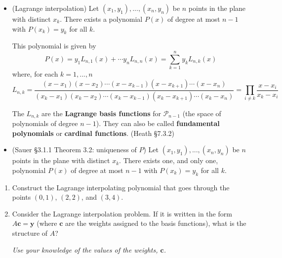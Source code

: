 \documentclass[12pt,letterpaper,noanswers]{exam}
\newcommand{\vc}[1]{\boldsymbol{#1}}
\begin{document}
\begin{tcolorbox}
\begin{itemize}
\itemsep0pt
\item (Lagrange interpolation)
Let $(x_1,y_1),...,(x_n,y_n)$ be $n$ points in the plane with distinct $x_k$.  There exists a polynomial $P(x)$ of degree at most $n-1$
with $P(x_k) = y_k$ for all $k$.

This polynomial is given by 
\[
P(x) = y_1L_{n,1}(x) + \cdots y_n L_{n,n}(x) = \sum_{k=1}^n y_k L_{n,k}(x)
\]
where, for each $k=1,...,n$
\[
L_{n,k} = \frac{(x-x_1)(x-x_2)\cdots(x-x_{k-1})(x-x_{k+1})\cdots(x-x_n)}
{(x_k-x_1)(x_k-x_2)\cdots(x_k-x_{k-1})(x_k-x_{k+1})\cdots(x_k-x_n)}
=\prod_{i\ne k} \frac{x-x_i}{x_k-x_i}
\]

The $L_{n,k}$ are the \textbf{Lagrange basis functions} for $\mathcal{P}_{n-1}$ (the space of polynomials of degree $n-1$).  They can also be called \textbf{fundamental polynomials} or \textbf{cardinal functions}.  (Heath \S 7.3.2)

\item (Sauer \S 3.1.1 Theorem 3.2: uniqueness of $P$) 
Let $(x_1,y_1),...,(x_n,y_n)$ be $n$ points in the plane with distinct $x_k$.  There exists one, and only one, polynomial $P(x)$ of degree at most $n-1$
with $P(x_k) = y_k$ for all $k$.


\end{itemize}

 
\end{tcolorbox}

\begin{enumerate}[resume=classQ]

\item Construct the Lagrange interpolating polynomial that goes through the points $(0,1)$, $(2,2)$, and $(3,4)$.  %

\vspace{1in}

\item Consider the Lagrange interpolation problem.  If it is written in the form $A\vc{c} = \vc{y}$ (where $\mathbf{c}$ are the weights assigned to the basis functions), what is the structure of $A$?

\emph{Use your knowledge of the values of the weights, $\vc{c}$.}
\vspace{0.5in}
\end{enumerate}
\end{document}
